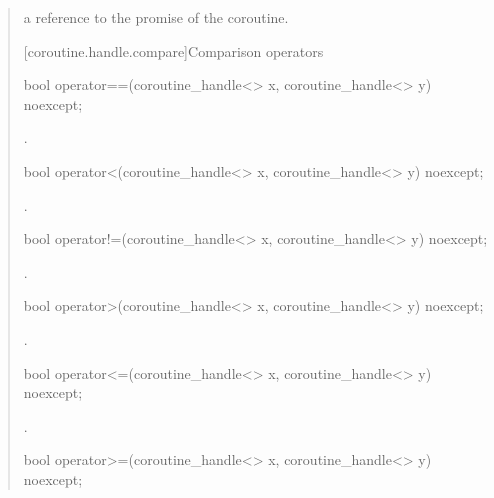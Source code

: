\begin{quote}
\begin{itemdescr}
  \pnum
  \returns a reference to the promise of the coroutine.
\end{itemdescr}

[coroutine.handle.compare]{Comparison operators}

\begin{itemdecl}
  bool operator==(coroutine_handle<> x, coroutine_handle<> y) noexcept;
\end{itemdecl}

\begin{itemdescr}
  \pnum
  \returns {}.
\end{itemdescr}

\begin{itemdecl}
  bool operator<(coroutine_handle<> x, coroutine_handle<> y) noexcept;
\end{itemdecl}

\begin{itemdescr}
  \pnum
  \returns {}.
\end{itemdescr}

\begin{itemdecl}
  bool operator!=(coroutine_handle<> x, coroutine_handle<> y) noexcept;
\end{itemdecl}

\begin{itemdescr}
  \pnum
  \returns {}.
\end{itemdescr}

\begin{itemdecl}
  bool operator>(coroutine_handle<> x, coroutine_handle<> y) noexcept;
\end{itemdecl}

\begin{itemdescr}
  \pnum
  \returns {}.
\end{itemdescr}

\begin{itemdecl}
  bool operator<=(coroutine_handle<> x, coroutine_handle<> y) noexcept;
\end{itemdecl}

\begin{itemdescr}
  \pnum
  \returns {}.
\end{itemdescr}

\begin{itemdecl}
  bool operator>=(coroutine_handle<> x, coroutine_handle<> y) noexcept;
\end{itemdecl}


\end{quote}

